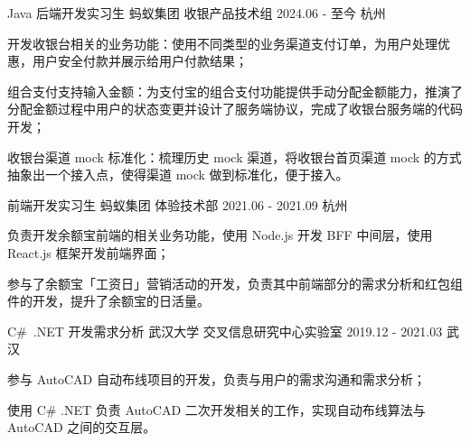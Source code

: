 

\begin{cventries}

  \cventry
    {Java 后端开发实习生} %
    {蚂蚁集团 \quad 收银产品技术组} %
    {2024.06 - 至今} %
    {杭州} %
    {
      \begin{cvitems} %
        \item {开发收银台相关的业务功能：使用不同类型的业务渠道支付订单，为用户处理优惠，用户安全付款并展示给用户付款结果；}
        \item {组合支付支持输入金额：为支付宝的组合支付功能提供手动分配金额能力，推演了分配金额过程中用户的状态变更并设计了服务端协议，完成了收银台服务端的代码开发；}
        \item {收银台渠道 mock 标准化：梳理历史 mock 渠道，将收银台首页渠道 mock 的方式抽象出一个接入点，使得渠道 mock 做到标准化，便于接入。}
      \end{cvitems}
    }

  \cventry
    {前端开发实习生} %
    {蚂蚁集团 \quad 体验技术部} %
    {2021.06 - 2021.09} %
    {杭州} %
    {
      \begin{cvitems} %
        \item {负责开发余额宝前端的相关业务功能，使用 Node.js 开发 BFF 中间层，使用 React.js 框架开发前端界面；}
        \item {参与了余额宝「工资日」营销活动的开发，负责其中前端部分的需求分析和红包组件的开发，提升了余额宝的日活量。}
      \end{cvitems}
    }

  \cventry
    {C\#\ .NET 开发{\enskip\cdotp\enskip}需求分析} %
    {武汉大学 \quad 交叉信息研究中心实验室} %
    {2019.12 - 2021.03} %
    {武汉} %
    {
      \begin{cvitems} %
        \item {参与 AutoCAD 自动布线项目的开发，负责与用户的需求沟通和需求分析；}
        \item {使用 C\# .NET 负责 AutoCAD 二次开发相关的工作，实现自动布线算法与 AutoCAD 之间的交互层。}
      \end{cvitems}
    }

\end{cventries}
